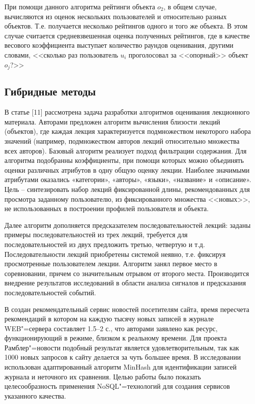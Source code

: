 \documentclass[a4paper,14pt,openany,final]{extreport} %
\begin{document}
При помощи данного алгоритма рейтинги объекта $o_2$, в общем случае, вычисляются из оценок нескольких пользователей и относительно разных объектов.  Т.е. получается несколько рейтингов одного и того же объекта. В этом случае считается средневзвешенная оценка полученных рейтингов, где в качестве весового коэффициента выступает количество раундов оценивания, другими словами, <<сколько раз пользователь $u_i$ проголосовал за <<опорный>> объект $o_j$?>>


\subsection{Гибридные методы}
\label{sec:hybrids}

В статье [11] рассмотрена задача разработки алгоритмов оценивания лекционного материала. Авторами предложен алгоритм вычисления близости лекций (объектов), где каждая лекция характеризуется подмножеством некоторого набора значений (например, подмножеством авторов лекций относительно множества всех авторов). Базовый алгоритм реализует подход фильтрации содержания. Для алгоритма подобранны коэффициенты, при помощи которых можно объединять оценки различных атрибутов в одну общую оценку лекции. Наиболее значимыми атрибутами оказались «категории», «авторы», «языки», «название» и «описание». Цель -- синтезировать набор лекций фиксированной длины, рекомендованных для просмотра заданному пользователю, из фиксированного множества <<новых>>, не использованных в построении профилей пользователя и объекта.

Далее алгоритм дополняется предсказателем последовательностей лекций: заданы примеры последовательностей из трех лекций, требуется для последовательностей из двух предложить третью, четвертую и т.д. Последовательности лекций приобретены системой неявно, т.е. фиксируя просмотренные пользователем лекции. Алгоритм занял первое место в соревновании, причем со значительным отрывом от второго места. Производится внедрение результатов исследований в области анализа сигналов и предсказания последовательностей событий.



    В \cite{b12} создан рекомендательный сервис новостей посетителям сайта, время пересчета рекомендаций в котором на каждую тысячу новых записей в журнале WEB"=сервера составляет 1.5--2 с., что авторами заявлено как ресурс, функционирующий в режиме, близком к реальному времени. Для проекта Рамблер"=новости подобный результат является удовлетворительным, так как 1000 новых запросов к сайту делается за чуть большее время. В исследовании использован адаптированный алгоритм MinHash для идентификации записей журнала и неточного их сравнения. Целью работы было показать целесообразность применения NoSQL"=технологий для создания сервисов указанного качества.
\end{document}
